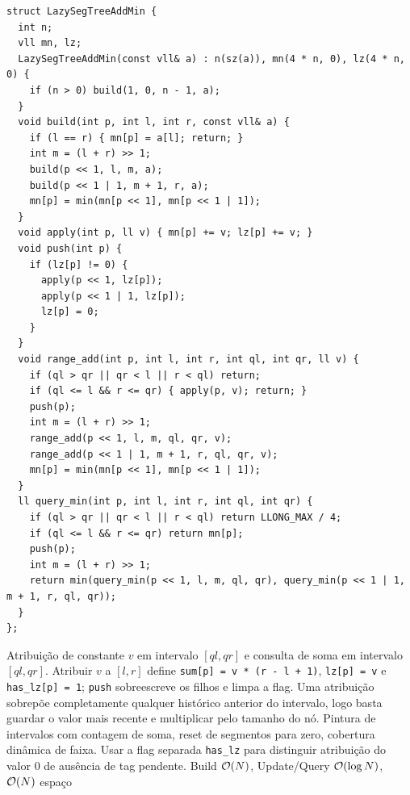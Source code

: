 \begin{lstlisting}
struct LazySegTreeAddMin {
  int n;
  vll mn, lz;
  LazySegTreeAddMin(const vll& a) : n(sz(a)), mn(4 * n, 0), lz(4 * n, 0) {
    if (n > 0) build(1, 0, n - 1, a);
  }
  void build(int p, int l, int r, const vll& a) {
    if (l == r) { mn[p] = a[l]; return; }
    int m = (l + r) >> 1;
    build(p << 1, l, m, a);
    build(p << 1 | 1, m + 1, r, a);
    mn[p] = min(mn[p << 1], mn[p << 1 | 1]);
  }
  void apply(int p, ll v) { mn[p] += v; lz[p] += v; }
  void push(int p) {
    if (lz[p] != 0) {
      apply(p << 1, lz[p]);
      apply(p << 1 | 1, lz[p]);
      lz[p] = 0;
    }
  }
  void range_add(int p, int l, int r, int ql, int qr, ll v) {
    if (ql > qr || qr < l || r < ql) return;
    if (ql <= l && r <= qr) { apply(p, v); return; }
    push(p);
    int m = (l + r) >> 1;
    range_add(p << 1, l, m, ql, qr, v);
    range_add(p << 1 | 1, m + 1, r, ql, qr, v);
    mn[p] = min(mn[p << 1], mn[p << 1 | 1]);
  }
  ll query_min(int p, int l, int r, int ql, int qr) {
    if (ql > qr || qr < l || r < ql) return LLONG_MAX / 4;
    if (ql <= l && r <= qr) return mn[p];
    push(p);
    int m = (l + r) >> 1;
    return min(query_min(p << 1, l, m, ql, qr), query_min(p << 1 | 1, m + 1, r, ql, qr));
  }
};
\end{lstlisting}

\algobox
  {Atribuição de constante $v$ em intervalo $[ql, qr]$ e consulta de soma em intervalo $[ql, qr]$.}
  {Atribuir $v$ a $[l, r]$ define \texttt{sum[p] = v * (r - l + 1)}, \texttt{lz[p] = v} e \texttt{has\_lz[p] = 1}; \texttt{push} sobreescreve os filhos e limpa a flag.}
  {Uma atribuição sobrepõe completamente qualquer histórico anterior do intervalo, logo basta guardar o valor mais recente e multiplicar pelo tamanho do nó.}
  {Pintura de intervalos com contagem de soma, reset de segmentos para zero, cobertura dinâmica de faixa.}
  {Usar a flag separada \texttt{has\_lz} para distinguir atribuição do valor $0$ de ausência de tag pendente.}
  {Build $\mathcal{O}(N)$, Update/Query $\mathcal{O}(\log N)$, $\mathcal{O}(N)$ espaço}

